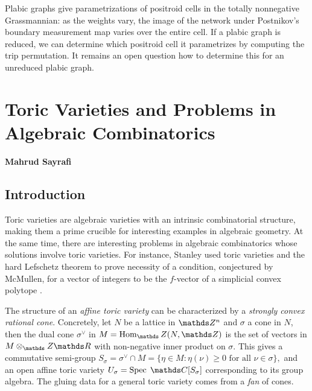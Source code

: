 \documentclass{paper}
\begin{document}
Plabic graphs give parametrizations of positroid cells in the totally nonnegative Grassmannian: as the weights vary, the image of the network under Postnikov's boundary measurement map varies over the entire cell. If a plabic graph is reduced, we can determine  which positroid cell it parametrizes by computing the trip permutation.  It remains an open question how to determine this for an unreduced plabic graph.

\section{Toric Varieties and Problems in Algebraic Combinatorics}
\hfill\textbf{Mahrud Sayrafi}
\subsection{Introduction}

Toric varieties are algebraic varieties with an intrinsic combinatorial structure, making them a prime crucible for interesting examples in algebraic geometry. At the same time, there are interesting problems in algebraic combinatorics whose solutions involve toric varieties. For instance, Stanley used toric varieties and the hard Lefschetz theorem to prove necessity of a condition, conjectured by McMullen, for a vector of integers to be the $f$-vector of a simplicial convex polytope \cite{Stanley80}.



The structure of an \emph{affine toric variety} can be characterized by a \emph{strongly convex rational cone}. Concretely, let $N$ be a lattice in $\ZZ^n$ and $\sigma$ a cone in $N$, then the dual cone $\sigma^\vee$ in $M=\Hom_\ZZ(N, \ZZ)$ is the set of vectors in $M\otimes_\ZZ\RR$ with non-negative inner product on $\sigma$. This gives a commutative semi-group \( S_\sigma = \sigma^\vee \cap M = \{ \eta \in M : \eta(\nu) \geq 0 \text{ for all } \nu\in\sigma \}, \) and an open affine toric variety \( U_\sigma = \Spec\;\CC[S_\sigma] \) corresponding to its group algebra.
The gluing data for a general toric variety comes from a \emph{fan} of cones.
\end{document}
